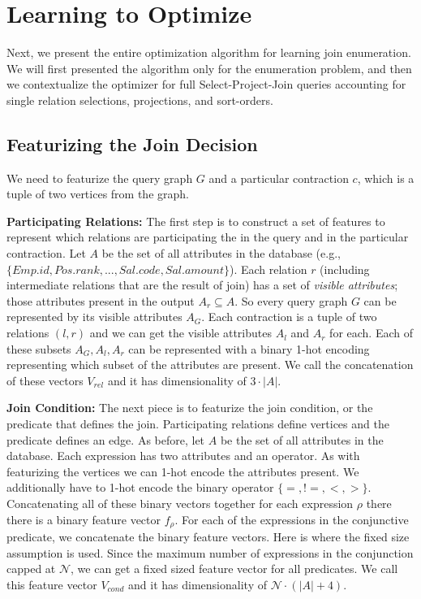 \section{Learning to Optimize}
Next, we present the entire optimization algorithm for learning join enumeration.
We will first presented the algorithm only for the enumeration problem, and then we contextualize the optimizer for full Select-Project-Join queries accounting for single relation selections, projections, and sort-orders.

\subsection{Featurizing the Join Decision}
We need to featurize the query graph $G$ and a particular contraction $c$, which is a tuple of two vertices from the graph. 

\vspace{0.5em} \noindent \textbf{Participating Relations: } The first step is to construct a set of features to represent which relations are participating the in the query and in the particular contraction. Let $A$ be the set of all attributes in the database (e.g., $ \{Emp.id, Pos.rank,...,Sal.code,Sal.amount\}$). Each relation $r$ (including intermediate relations that are the result of join) has a set of \emph{visible attributes}; those attributes present in the output $A_r \subseteq A$. So every query graph $G$ can be represented by its visible attributes $A_G$. Each contraction is a tuple of two relations $(l,r)$ and we can get the visible attributes $A_l$ and $A_r$ for each. Each of these subsets $A_G, A_l, A_r$ can be represented with a binary 1-hot encoding representing which subset of the attributes are present. We call the concatenation of these vectors $V_{rel}$ and it has dimensionality of $3\cdot|A|$. 

\vspace{0.5em} \noindent \textbf{Join Condition: } The next piece is to featurize the join condition, or the predicate that defines the join. Participating relations define vertices and the predicate defines an edge. As before, let $A$ be the set of all attributes in the database. Each expression has two attributes and an operator. As with featurizing the vertices we can 1-hot encode the attributes present. We additionally have to 1-hot encode the binary operator $\{=,!=,<,>\}$. Concatenating all of these binary vectors together for each expression $\rho$ there there is a binary feature vector $f_\rho$.  For each of the expressions in the conjunctive predicate, we concatenate the binary feature vectors. Here is where the fixed size assumption is used. Since the maximum number of expressions in the conjunction capped at $\mathcal{N}$, we can get a fixed sized feature vector for all predicates. We call this feature vector $V_{cond}$ and it has dimensionality of $\mathcal{N} \cdot(|A|+4)$. 

